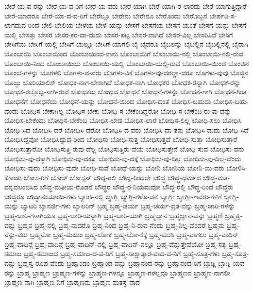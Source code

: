 {ಬೇರೆ-ಯ-ವ-ರನ್ನು
ಬೇರೆ-ಯ-ವ-ರಿಗೆ
ಬೇರೆ-ಯ-ವರು
ಬೇರೆ-ಯಾಗಿ
ಬೇರೆ-ಯಾಗಿ-ರ-ಲಾರದು
ಬೇರೆ-ಯಾಗುತ್ತಿದ್ದಾರೆ
ಬೇರೆ-ಯಾದರೂ
ಬೇರೆ-ಯಾ-ದ-ವ-ರಿಗೆ
ಬೇರೆಲ್ಲೂ
ಬೇರೇನು
ಬೇರೇನೂ
ಬೇರೊಂದು
ಬೇರೊಬ್ಬನ
ಬೇರ್ಪಡಿ-ಸ-ಲಾಗದುದ-ರಿಂದ
ಬೇಲಿ
ಬೇಲಿಯ
ಬೇಳೆಯ
ಬೇಳೆ-ಯನ್ನು
ಬೇಸಗೆ
ಬೇಸಗೆಯ
ಬೇಸಗೆ-ಯಂತೆ
ಬೇಸಗೆ-ಯನ್ನು
ಬೇಸಗೆ-ಯಲ್ಲಿ
ಬೇಸತ್ತು
ಬೇಸರ
ಬೇಸರ-ಕರ-ವಾ-ದುದು
ಬೇಸರ-ಪಟ್ಟ
ಬೇಸರ-ವಾಗಿದೆ
ಬೇಸರ-ವಿಲ್ಲ
ಬೇಸರಿಸಿವೆ
ಬೇಸಿಗೆ
ಬೇಸಿಗೆಯ
ಬೇಸಿಗೆ-ಯಲ್ಲಿ
ಬೇಸಿಗೆ-ಯಲ್ಲೂ
ಬೇಸಿಗೆ-ಯಾಗಲಿ
ಬೈ
ಬೈದರೂ
ಬೈಬಲನ್ನು
ಬೈಬಲ್ಲಿನ
ಬೈಬಲ್ಲಿನಲ್ಲಿ
ಬೈರಾಗಿ
ಬೊಂಬಾಯಿ
ಬೊಂಬಾಯಿಂದ
ಬೊಂಬಾಯಿಂದ-ನಾನು
ಬೊಂಬಾಯಿಗೆ
ಬೊಂಬಾಯಿ-ನಲ್ಲಿ
ಬೊಂಬಾಯಿ-ನಲ್ಲಿ-ರುವ
ಬೊಂಬಾಯಿ-ನಿಂದ
ಬೊಂಬಾಯಿಯ
ಬೊಂಬಾಯಿ-ಯಲ್ಲಿ
ಬೊಂಬಾಯಿ-ಯಲ್ಲಿ-ರುವ
ಬೊಂಬಾಯಿ-ಯಿಂದ
ಬೊಂಬಿನ
ಬೊಂಬೆ-ಗಳನ್ನು
ಬೊಗಳಲಿ
ಬೊಗಳು-ವ-ವರು
ಬೊಗಳು-ವಿಕೆ
ಬೊಗಳು-ವು-ದರಲ್ಲಾ-ದರೂ
ಬೊಗಳು-ವುವು
ಬೊಜ್ಜಿನ
ಬೊಜ್ಜು
ಬೊರಿಯಾಲಿಸ್
ಬೋಧಕ-ನಾಗ-ಬೇಕಾಗಿದೆ
ಬೋಧಕ-ನಾಗಿ
ಬೋಧಕರ
ಬೋಧಕ-ರನ್ನಾಗಿ
ಬೋಧಕ-ರನ್ನು
ಬೋಧಕ-ರಲ್ಲೊಬ್ಬ-ನಾಗಿ-ರುವೆ
ಬೋಧಕರು
ಬೋಧದ
ಬೋಧನೆ
ಬೋಧನೆ-ಗಳನ್ನು
ಬೋಧನೆ-ಗಾಗಿ
ಬೋಧನೆ-ಗಿಂತ
ಬೋಧನೆಗೆ
ಬೋಧನೆಯ
ಬೋಧನೆ-ಯನ್ನು
ಬೋಧನೆ-ಯಿಂದ
ಬೋಧಿಸ-ದಂತೆ
ಬೋಧಿಸ-ಬಹುದು
ಬೋಧಿಸ-ಬಹು-ದೆಂದು
ಬೋಧಿಸ-ಬೇಕಾಗಿಲ್ಲ
ಬೋಧಿಸ-ಬೇಕು
ಬೋಧಿ-ಸ-ಬೇಕೆಂದಿದ್ದರೋ
ಬೋಧಿ-ಸ-ಬೇಕೆಂದಿ-ರು-ವು-ದನ್ನು
ಬೋಧಿಸ-ಬೇಕೆಂದು
ಬೋಧಿಸ-ಬೇಕೆಂಬ
ಬೋಧಿಸ-ಬೇಡ
ಬೋಧಿಸ-ಲಾರೆ
ಬೋಧಿಸ-ಲಿಲ್ಲ
ಬೋಧಿ-ಸಲು
ಬೋಧಿಸಿ
ಬೋಧಿ-ಸಿದ
ಬೋಧಿಸಿ-ದರೆ
ಬೋಧಿಸಿ-ದರೋ
ಬೋಧಿಸಿ-ದ-ವರು
ಬೋಧಿಸಿ-ದಾ-ತನು
ಬೋಧಿಸಿ-ದುದು
ಬೋಧಿ-ಸಿದೆ
ಬೋಧಿಸಿದ್ದವೋ
ಬೋಧಿಸಿದ್ದುದ-ರಿಂದ
ಬೋಧಿಸು
ಬೋಧಿ-ಸುತ್ತ
ಬೋಧಿಸುತ್ತದೆ
ಬೋಧಿ-ಸುತ್ತಾ
ಬೋಧಿಸುತ್ತಾರೆ
ಬೋಧಿಸುತ್ತಾರೋ
ಬೋಧಿಸುತ್ತಿ-ರುವು-ದೆಲ್ಲ
ಬೋಧಿಸುತ್ತಿರು-ವೆಯೆ
ಬೋಧಿಸುತ್ತೇನೆ
ಬೋಧಿ-ಸುವ
ಬೋಧಿಸು-ವನು
ಬೋಧಿಸು-ವು-ದಕ್ಕಾಗಿ
ಬೋಧಿಸು-ವು-ದಕ್ಕೂ
ಬೋಧಿಸು-ವು-ದಕ್ಕೆ
ಬೋಧಿಸು-ವು-ದಿಲ್ಲ
ಬೋಧಿಸು-ವು-ದಿಲ್ಲ-ವೆಂದು
ಬೋಧಿಸು-ವುದು
ಬೋಧಿಸು-ವುದೇ
ಬೋಧಿ-ಸುವೆ
ಬೋಧೆ-ಯನ್ನು
ಬೋನಿ
ಬೋನಿಯ
ಬೋನಿ-ಯ-ವರು
ಬೋಳಿಸಿ-ಕೊಂಡು
ಬೋಸ-ರಿಗೆ
ಬೋಸ್
ಬೋಸ್ಟನ್
ಬೌದ್ದ-ರಲ್ಲಿ
ಬೌದ್ದ-ರಿಂದಲೇ
ಬೌದ್ಧ
ಬೌದ್ಧ-ಧರ್ಮದ
ಬೌದ್ಧ-ಮತ-ವನ್ನವಲಂಬಿಸಿದ
ಬೌದ್ಧ-ಮತೀಯ-ರೊಡನೆ
ಬೌದ್ಧರ
ಬೌದ್ಧ-ರ-ನಿಯಮವೋ
ಬೌದ್ಧ-ರಲ್ಲಿ
ಬೌದ್ಧ-ರಿಂದ
ಬೌದ್ಧರು
ಬೌದ್ಧರೂ
ಬೌದ್ಧಾನುಯಾಯಿ-ಗಳು
ಬ್ಯಾಂಕಿ-ನಲ್ಲಿ
ಬ್ಯಾಗ್ಲಿ
ಬ್ಯಾಗ್ಲಿ-ಗಳೊ-ಡನೆ
ಬ್ಯಾಗ್ಲೀ
ಬ್ಯಾಗ್ಲೀ-ಇವರು-ಗಳಿಗೆ
ಬ್ಯಾಗ್ಲಿ-ಯನ್ನು
ಬ್ಯಾಟರಿ
ಬ್ಯಾನರ್ಜಿ-ಗಳು
ಬ್ಯಾಲರಿನ್
ಬ್ರಹ್ಮ
ಬ್ರಹ್ಮ-ಚರ್ಯ
ಬ್ರಹ್ಮ-ಚರ್ಯ-ವ್ರತ-ವನ್ನು
ಬ್ರಹ್ಮ-ಚಾರಿ-ಗಳನ್ನು
ಬ್ರಹ್ಮ-ಚಾರಿ-ಗಳಾಗಿಯೂ
ಬ್ರಹ್ಮ-ಚಾರಿ-ಯನ್ನಾಗಿ
ಬ್ರಹ್ಮ-ಚಾರಿ-ಯಾಗಿ
ಬ್ರಹ್ಮಜ್ಞಾನ
ಬ್ರಹ್ಮಜ್ಞಾನ-ವನ್ನು
ಬ್ರಹ್ಮಣಿ
ಬ್ರಹ್ಮತ್ವ-ವನ್ನು
ಬ್ರಹ್ಮನ
ಬ್ರಹ್ಮ-ನಲ್ಲಿ
ಬ್ರಹ್ಮ-ನಾದರೊ
ಬ್ರಹ್ಮ-ನಿಂದ
ಬ್ರಹ್ಮ-ನಿ-ರುವ-ನೆಂದು
ಬ್ರಹ್ಮ-ನಿಲ್ಲ-ವೆಂದರೆ
ಬ್ರಹ್ಮನು
ಬ್ರಹ್ಮ-ನೆನ್ನು-ವರು
ಬ್ರಹ್ಮನೋ
ಬ್ರಹ್ಮ-ಮಯಂ
ಬ್ರಹ್ಮ-ಲೋಕ
ಬ್ರಹ್ಮ-ಲೋ-ಕಕ್ಕೆ
ಬ್ರಹ್ಮ-ವದಸಿ
ಬ್ರಹ್ಮ-ವಾಗಲು
ಬ್ರಹ್ಮ-ವಾದಿನ್
ಬ್ರಹ್ಮ-ವಾದಿನ್ಗೆ
ಬ್ರಹ್ಮ-ವಾದಿನ್ಗೆ
ಬ್ರಹ್ಮ-ವಾದಿನ್-ನಲ್ಲಿ
ಬ್ರಹ್ಮ-ವಾದಿನ್-ನಲ್ಲೂ
ಬ್ರಹ್ಮ-ವೆನ್ನುತ್ತೇವೆಯೋ
ಬ್ರಹ್ಮ-ಸತ್ಯ
ಬ್ರಹ್ಮ-ಸಮಾಜ
ಬ್ರಹ್ಮ-ಸಮಾಜದ
ಬ್ರಹ್ಮ-ಸಮಾಜ-ದ-ವ-ರಿಗೆ
ಬ್ರಹ್ಮ-ಸಾಕ್ಷಾತ್ಕಾರ-ವಾದ-ವ-ನಿಗೆ
ಬ್ರಹ್ಮ-ಸೂತ್ರ-ಗಳು
ಬ್ರಹ್ಮ-ಸೂತ್ರ-ವನ್ನು
ಬ್ರಹ್ಮಸ್ವ-ರೂಪ-ವೆಂದು
ಬ್ರಹ್ಮಾಂಡಂ
ಬ್ರಹ್ಮಾಂಡ-ವನ್ನು
ಬ್ರಹ್ಮಾನಂದ-ರನ್ನು
ಬ್ರಹ್ಮಾನಂದ-ರಿಗೆ
ಬ್ರಾಡ್ಲಿ
ಬ್ರಾಡ್ಲಿ-ಯವ-ರನ್ನು
ಬ್ರಾಹ್ಮ
ಬ್ರಾಹ್ಮಣ
ಬ್ರಾಹ್ಮಣ-ಗಳನ್ನು
ಬ್ರಾಹ್ಮಣ-ಗಳನ್ನೂ
ಬ್ರಾಹ್ಮಣ-ಗಳೆಲ್ಲವೂ
ಬ್ರಾಹ್ಮಣನ
ಬ್ರಾಹ್ಮಣ-ನಾಗಲೀ
ಬ್ರಾಹ್ಮಣ-ನಾಗಿ
ಬ್ರಾಹ್ಮಣ-ನಿಗೆ
ಬ್ರಾಹ್ಮಣನು
ಬ್ರಾಹ್ಮಣ-ಮತಸ್ಥ-ನಾದ
}

